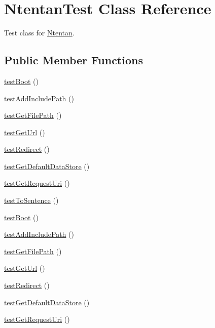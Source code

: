 \hypertarget{class_ntentan_test}{
\section{NtentanTest Class Reference}
\label{class_ntentan_test}
}


Test class for \hyperlink{class_ntentan}{Ntentan}.  


\subsection*{Public Member Functions}
\begin{DoxyCompactItemize}
\item 
\hyperlink{class_ntentan_test_a0cbc147d0e996c2499304f98c712fd31}{testBoot} ()
\item 
\hyperlink{class_ntentan_test_a25954a594bd0034f0d7e1eb1726c10f4}{testAddIncludePath} ()
\item 
\hyperlink{class_ntentan_test_adbead9bd4b45d8c31974f0bd80ced3b2}{testGetFilePath} ()
\item 
\hyperlink{class_ntentan_test_a77a04375ee0e8137b60886a3f9d1d532}{testGetUrl} ()
\item 
\hyperlink{class_ntentan_test_a9e6c5003f8c8c337e1dc4a39143f3c21}{testRedirect} ()
\item 
\hyperlink{class_ntentan_test_ad1e972251ec98aa58d2e9e5019192e1c}{testGetDefaultDataStore} ()
\item 
\hyperlink{class_ntentan_test_a1f1fe726adf6f721db8b887f3f83bf46}{testGetRequestUri} ()
\item 
\hyperlink{class_ntentan_test_aa65644c1d96fa14989be0a26aa2f7535}{testToSentence} ()
\item 
\hyperlink{class_ntentan_test_a0cbc147d0e996c2499304f98c712fd31}{testBoot} ()
\item 
\hyperlink{class_ntentan_test_a25954a594bd0034f0d7e1eb1726c10f4}{testAddIncludePath} ()
\item 
\hyperlink{class_ntentan_test_adbead9bd4b45d8c31974f0bd80ced3b2}{testGetFilePath} ()
\item 
\hyperlink{class_ntentan_test_a77a04375ee0e8137b60886a3f9d1d532}{testGetUrl} ()
\item 
\hyperlink{class_ntentan_test_a9e6c5003f8c8c337e1dc4a39143f3c21}{testRedirect} ()
\item 
\hyperlink{class_ntentan_test_ad1e972251ec98aa58d2e9e5019192e1c}{testGetDefaultDataStore} ()
\item 
\hyperlink{class_ntentan_test_a1f1fe726adf6f721db8b887f3f83bf46}{testGetRequestUri} ()

\end{DoxyCompactItemize}
